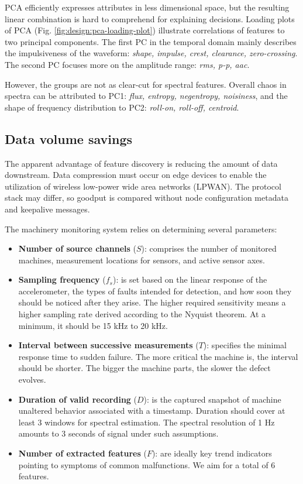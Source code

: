 PCA efficiently expresses attributes in less dimensional space, but the resulting linear combination is hard to comprehend for explaining decisions. Loading plots of PCA (Fig. \ref{fig:design:pca-loading-plot}) illustrate correlations of features to two principal components. The first PC in the temporal domain mainly describes the impulsiveness of the waveform: \emph{shape, impulse, crest, clearance, zero-crossing}. The second PC focuses more on the amplitude range: \emph{rms, p-p, aac}.  

However, the groups are not as clear-cut for spectral features. Overall chaos in spectra can be attributed to PC1: \emph{flux, entropy, negentropy, noisiness}, and the shape of frequency distribution to PC2: \emph{roll-on, roll-off, centroid}.


\subsection{Data volume savings}
The apparent advantage of feature discovery is reducing the amount of data downstream. Data compression must occur on edge devices to enable the utilization of wireless low-power wide area networks (LPWAN). The protocol stack may differ, so goodput is compared without node configuration metadata and keepalive messages. 

The machinery monitoring system relies on determining several parameters:
\begin{itemize}
\itemsep0pt
\item \textbf{Number of source channels} ($S$): comprises the number of monitored machines, measurement locations for sensors, and active sensor axes.
\item \textbf{Sampling frequency} ($f_s$): is set based on the linear response of the accelerometer, the types of faults intended for detection, and how soon they should be noticed after they arise. The higher required sensitivity means a higher sampling rate derived according to the Nyquist theorem. At a minimum, it should be 15 kHz to 20 kHz.
\item \textbf{Interval between successive measurements} ($T$): specifies the minimal response time to sudden failure. The more critical the machine is, the interval should be shorter. The bigger the machine parts, the slower the defect evolves.
\item \textbf{Duration of valid recording} ($D$): is the captured snapshot of machine unaltered behavior associated with a timestamp. Duration should cover at least 3 windows for spectral estimation. The spectral resolution of 1 Hz amounts to 3 seconds of signal under such assumptions.
\item \textbf{Number of extracted features} ($F$): are ideally key trend indicators pointing to symptoms of common malfunctions. We aim for a total of 6 features.
\end{itemize}

